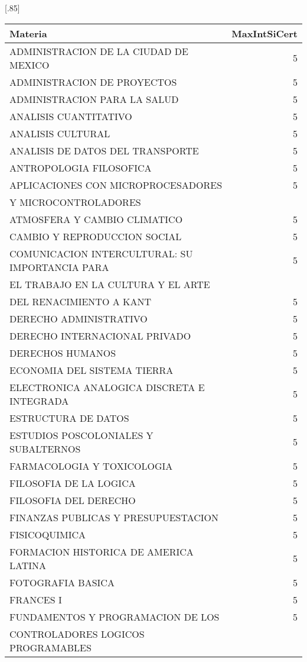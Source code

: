 \documentclass[12pt]{article}
\begin{document}
\begin{table}[ht]
\centering
\scalebox{0.75}[.85]{
\begin{tabular}{lr}
  \hline
Materia & MaxIntSiCert \\ 
  \hline
  ADMINISTRACION DE LA CIUDAD DE MEXICO & 5 \\ 
  ADMINISTRACION DE PROYECTOS & 5 \\ 
  ADMINISTRACION PARA LA SALUD & 5 \\ 
  ANALISIS CUANTITATIVO & 5 \\ 
  ANALISIS CULTURAL & 5 \\ 
  ANALISIS DE DATOS DEL TRANSPORTE & 5 \\ 
  ANTROPOLOGIA FILOSOFICA & 5 \\ 
  APLICACIONES CON MICROPROCESADORES & 5 \\ 
   Y MICROCONTROLADORES & \\ 
  ATMOSFERA Y CAMBIO CLIMATICO & 5 \\ 
  CAMBIO Y REPRODUCCION SOCIAL & 5 \\ 
  COMUNICACION INTERCULTURAL: SU IMPORTANCIA PARA & 5 \\ 
     EL TRABAJO EN LA CULTURA Y EL ARTE & \\ 
  DEL RENACIMIENTO A KANT & 5 \\ 
  DERECHO ADMINISTRATIVO & 5 \\ 
  DERECHO INTERNACIONAL PRIVADO & 5 \\ 
  DERECHOS HUMANOS & 5 \\ 
  ECONOMIA DEL SISTEMA TIERRA & 5 \\ 
  ELECTRONICA ANALOGICA DISCRETA E INTEGRADA & 5 \\ 
  ESTRUCTURA DE DATOS & 5 \\ 
  ESTUDIOS POSCOLONIALES Y SUBALTERNOS & 5 \\ 
  FARMACOLOGIA Y TOXICOLOGIA & 5 \\ 
  FILOSOFIA DE LA LOGICA & 5 \\ 
  FILOSOFIA DEL DERECHO & 5 \\ 
  FINANZAS PUBLICAS Y PRESUPUESTACION & 5 \\ 
  FISICOQUIMICA & 5 \\ 
  FORMACION HISTORICA DE AMERICA LATINA & 5 \\ 
  FOTOGRAFIA BASICA & 5 \\ 
  FRANCES I & 5 \\ 
  FUNDAMENTOS Y PROGRAMACION DE LOS & 5 \\ 
   CONTROLADORES LOGICOS PROGRAMABLES & \\ 

\end{tabular}}
\end{table}
\end{document}
